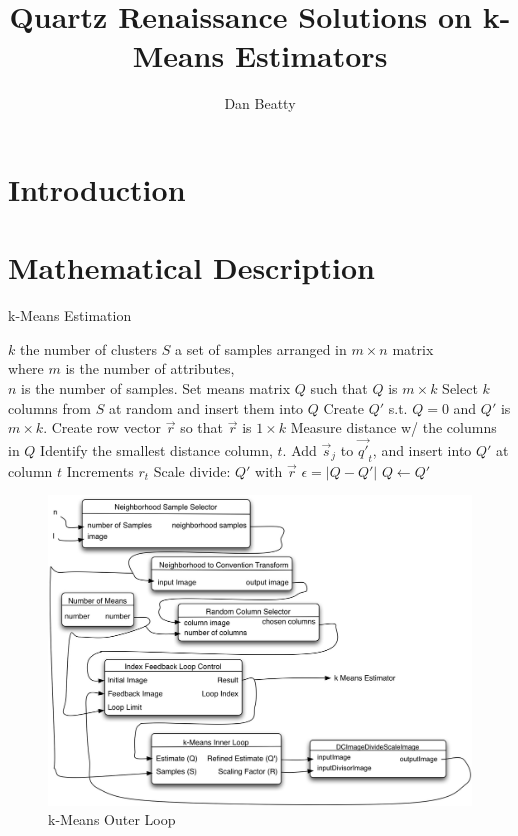 \documentclass[11pt]{article}
\title{Quartz Renaissance Solutions on k-Means Estimators}
\author{Dan Beatty}
\begin{document}
\section{Introduction}

\section{Mathematical Description}


\begin{algorithm}
\caption{k-Means Estimation}
\label{alg:kMeans}
\begin{algorithmic}
	\REQUIRE $k$ the number of clusters
	\REQUIRE $S$ a set of samples arranged in $m \times n$ matrix \\
		where $m$ is the number of attributes, \\
		$n$ is the number of samples.
	\STATE Set means matrix $Q$ such that $Q$ is $m \times k$
	\STATE Select $k$ columns from $S$ at random and insert them into $Q$
	\REPEAT
		\STATE Create $Q'$ s.t. $Q = 0$ and $Q'$ is $m \times k$.
		\STATE Create row vector $\vec{r}$ so that $\vec{r}$ is $1 \times k$
			\STATE Measure distance w/ the columns in $Q$
			\STATE Identify the smallest distance column, $t$.
			\STATE Add $\vec{s}_j$ to $\vec{q'}_t$, and insert into $Q'$ at column $t$
			\STATE Increments $r_t$
		\ENDFOR
		\STATE Scale divide: $Q'$ with $\vec{r}$
		\STATE $\epsilon = |Q - Q'|$
		\STATE $Q \leftarrow Q'$
\end{algorithmic}
\end{algorithm}


\begin{figure}[htbp] %
   \centering
   \includegraphics[width=5in]{kMeansOuterLoop.jpg} 
   \caption{k-Means Outer Loop}
   \label{kMeansOuterLoop}
\end{figure}
\end{document}
